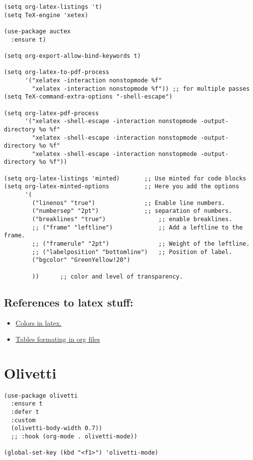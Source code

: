 \documentclass[11pt]{article}
\begin{document}
\begin{verbatim}
(setq org-latex-listings 't)
(setq TeX-engine 'xetex)

(use-package auctex
  :ensure t)

(setq org-export-allow-bind-keywords t)

(setq org-latex-to-pdf-process 
      '("xelatex -interaction nonstopmode %f"
        "xelatex -interaction nonstopmode %f")) ;; for multiple passes
(setq TeX-command-extra-options "-shell-escape")

(setq org-latex-pdf-process
      '("xelatex -shell-escape -interaction nonstopmode -output-directory %o %f"
        "xelatex -shell-escape -interaction nonstopmode -output-directory %o %f"
        "xelatex -shell-escape -interaction nonstopmode -output-directory %o %f"))

(setq org-latex-listings 'minted) 		;; Use minted for code blocks
(setq org-latex-minted-options 			;; Here you add the options 
      '(
        ("linenos" "true")				;; Enable line numbers.
        ("numbersep" "2pt")				;; separation of numbers.
        ("breaklines" "true")				;; enable breaklines.
        ;; ("frame" "leftline")				;; Add a leftline to the frame.
        ;; ("framerule" "2pt")				;; Weight of the leftline.
        ;; ("labelposition" "bottomline")	;; Position of label.
        ("bgcolor" "GreenYellow!20")

        ))		;; color and level of transparency.
\end{verbatim}
\subsection{References to latex stuff:}
\label{sec:org7ade5cd}
\begin{itemize}
\item \href{https://www.overleaf.com/learn/latex/Using\_colors\_in\_LaTeX}{Colors in latex.}
\item \href{https://orgmode.org/manual/Tables-in-LaTeX-export.html}{Tables formating in org files}
\end{itemize}
\section{Olivetti}
\label{sec:org79116c1}
\begin{verbatim}
(use-package olivetti
  :ensure t
  :defer t
  :custom
  (olivetti-body-width 0.7))
  ;; :hook (org-mode . olivetti-mode))

(global-set-key (kbd "<f1>") 'olivetti-mode)
\end{verbatim}
\end{document}

